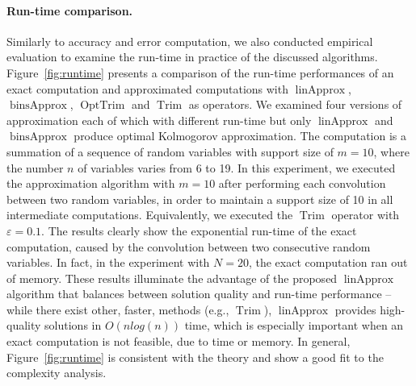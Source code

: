 \documentclass[letterpaper]{article} %
\DeclareMathOperator{\Trim}{Trim}
\DeclareMathOperator{\KlmApprox}{linApprox}
\DeclareMathOperator{\BinsApprox}{binsApprox}
\DeclareMathOperator{\OptTrim}{OptTrim}
\begin{document}
\paragraph{Run-time comparison.}
Similarly to accuracy and error computation, we also conducted empirical evaluation to examine the run-time in practice of the discussed algorithms. Figure~\ref{fig:runtime} presents a comparison of the run-time performances of an exact computation and approximated computations with $\KlmApprox$, $\BinsApprox$, $\OptTrim$ and $\Trim$ as operators. We examined four versions of approximation each of which with different run-time but only $\KlmApprox$ and $\BinsApprox$ produce optimal Kolmogorov approximation. The computation is a summation of a sequence of random variables with support size of $m{=}10$, where the number $n$ of variables varies from 6 to 19. In this experiment, we executed the approximation algorithm with $m{=}10$ after performing each convolution between two random variables, in order to maintain a support size of 10 in all intermediate computations. Equivalently, we executed the $\Trim$ operator with $\varepsilon=0.1$.
The results clearly show the exponential run-time of the exact computation, caused by the convolution between two consecutive random variables. In fact, in the experiment with $N{=}20$, the exact computation ran out of memory. These results illuminate the advantage of the proposed $\KlmApprox$ algorithm that balances between solution quality and run-time performance -- while there exist other, faster, methods (e.g., $\Trim$), $\KlmApprox$ provides high-quality solutions in $O(n log(n))$ time, which is especially important when an exact computation is not feasible, due to time or memory. In general, Figure~\ref{fig:runtime} is consistent with the theory and show a good fit to the complexity analysis. 
\end{document}
